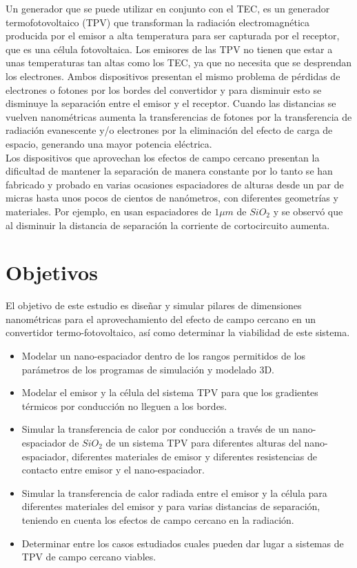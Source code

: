 Un generador que se puede utilizar en conjunto con el TEC, es un generador termofotovoltaico (TPV) que transforman la radiación electromagnética producida por el emisor a alta temperatura para ser capturada por el receptor, que es una célula fotovoltaica. Los emisores de las TPV no tienen que estar a unas temperaturas tan altas como los TEC, ya que no necesita que se desprendan los electrones. Ambos dispositivos presentan el mismo problema de pérdidas de electrones o fotones por los bordes del convertidor y para disminuir esto se disminuye la separación entre el emisor y el receptor. Cuando las distancias se vuelven nanométricas aumenta la transferencias de fotones por la transferencia de radiación evanescente y/o electrones por la eliminación del efecto de carga de espacio, generando una mayor potencia eléctrica.\\

Los dispositivos que aprovechan los efectos de campo cercano presentan la dificultad de mantener la separación de manera constante por lo tanto se han fabricado y probado en varias ocasiones espaciadores de alturas desde un par de micras hasta unos pocos de cientos de nanómetros, con diferentes geometrías y materiales. Por ejemplo, en \cite{doi:MicroGapTPV} usan espaciadores de $1\mu m$ de $SiO_2$ y se observó que al disminuir la distancia de separación la corriente de cortocircuito aumenta.


\section{Objetivos}
El objetivo de este estudio es diseñar y simular pilares de dimensiones nanométricas para el aprovechamiento del efecto de campo cercano en un convertidor termo-fotovoltaico, así como determinar la viabilidad de este sistema. 
\begin{itemize}
	\item Modelar un nano-espaciador dentro de los rangos permitidos de los parámetros de los programas de simulación y modelado 3D.
	\item Modelar el emisor y la célula del sistema TPV para que los gradientes térmicos por conducción no lleguen a los bordes.
	\item Simular la transferencia de calor por conducción a través de un nano-espaciador de $SiO_2$ de un sistema TPV para diferentes alturas del nano-espaciador, diferentes materiales de emisor y diferentes resistencias de contacto entre emisor y el nano-espaciador.
	\item Simular la transferencia de calor radiada entre el emisor y la célula para diferentes materiales del emisor y para varias distancias de separación, teniendo en cuenta los efectos de campo cercano en la radiación.
	\item Determinar entre los casos estudiados cuales pueden dar lugar a sistemas de TPV de campo cercano viables.
\end{itemize}


